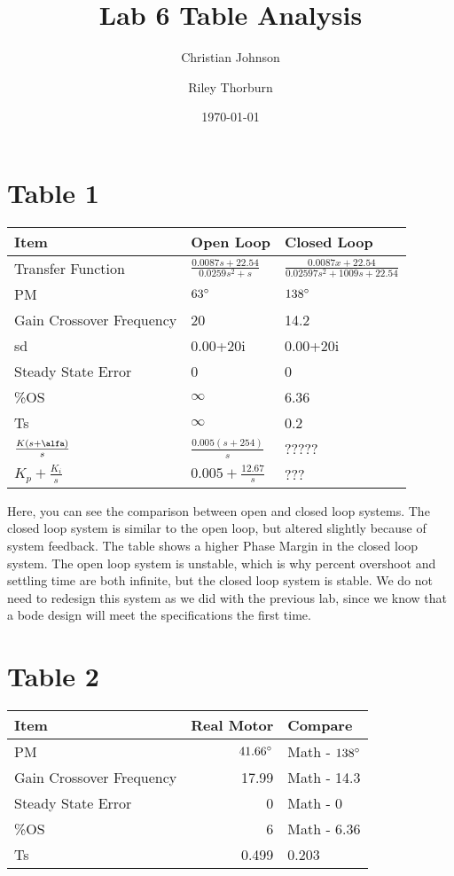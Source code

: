 \documentclass[11pt]{article}
\author{Christian Johnson \and Riley Thorburn}
\date{\today}
\title{Lab 6 Table Analysis}
\begin{document}
\maketitle

\section{Table 1}
\label{sec:orga8033e5}

\begin{center}
\begin{tabular}{lll}
Item & Open Loop & Closed Loop\\[0pt]
\hline
Transfer Function & \(\frac{0.0087s+22.54}{0.0259s^2+s}\) & \(\frac{0.0087x+22.54}{0.02597s^2+1009s+22.54}\)\\[0pt]
PM & \(63\degree\) & \(138\degree\)\\[0pt]
Gain Crossover Frequency & 20 & 14.2\\[0pt]
sd & 0.00+20i & 0.00+20i\\[0pt]
Steady State Error & 0 & 0\\[0pt]
\%OS & \(\infty\) & 6.36\\[0pt]
Ts & \(\infty\) & 0.2\\[0pt]
\(\frac{K(s+\alfa)}{s}\) & \(\frac{0.005(s+254)}{s}\) & ?????\\[0pt]
\(K_p+\frac{K_i}{s}\) & \(0.005+\frac{12.67}{s}\) & ???\\[0pt]
\end{tabular}
\end{center}

Here, you can see the comparison between open and closed loop systems. The closed loop system is similar to the open loop, but altered slightly because of system feedback. The table shows a higher Phase Margin in the closed loop system. The open loop system is unstable, which is why percent overshoot and settling time are both infinite, but the closed loop system is stable. We do not need to redesign this system as we did with the previous lab, since we know that a bode design will meet the specifications the first time.

\section{Table 2}
\label{sec:org71f812a}

\begin{center}
\begin{tabular}{lrl}
Item & Real Motor & Compare\\[0pt]
\hline
PM & \(41.66\degree\) & Math - \(138\degree\)\\[0pt]
Gain Crossover Frequency & 17.99 & Math - 14.3\\[0pt]
Steady State Error & 0 & Math - 0\\[0pt]
\%OS & 6 & Math - 6.36\\[0pt]
Ts & 0.499 & 0.203\\[0pt]
\end{tabular}
\end{center}
\end{document}
